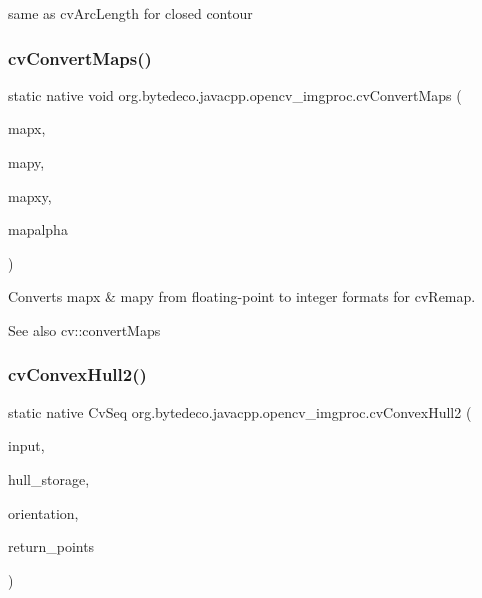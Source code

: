 same as cv\+Arc\+Length for closed contour \mbox{\label{group__imgproc__c_ga9e8c4e8b6609f6bad114d7a6e597d530}} 
\subsubsection{\texorpdfstring{cv\+Convert\+Maps()}{cvConvertMaps()}}
{\footnotesize\ttfamily static native void org.\+bytedeco.\+javacpp.\+opencv\+\_\+imgproc.\+cv\+Convert\+Maps (\begin{DoxyParamCaption}\item[{@Const Cv\+Arr}]{mapx,  }\item[{@Const Cv\+Arr}]{mapy,  }\item[{Cv\+Arr}]{mapxy,  }\item[{Cv\+Arr}]{mapalpha }\end{DoxyParamCaption})\hspace{0.3cm}{\ttfamily [static]}}



Converts mapx \& mapy from floating-\/point to integer formats for cv\+Remap. 

\begin{DoxySeeAlso}{See also}
cv\+::convert\+Maps 
\end{DoxySeeAlso}
\mbox{\label{group__imgproc__c_ga97e54b0658572d02cdef5ae91799499d}} 
\subsubsection{\texorpdfstring{cv\+Convex\+Hull2()}{cvConvexHull2()}}
{\footnotesize\ttfamily static native Cv\+Seq org.\+bytedeco.\+javacpp.\+opencv\+\_\+imgproc.\+cv\+Convex\+Hull2 (\begin{DoxyParamCaption}\item[{@Const Cv\+Arr}]{input,  }\item[{Pointer}]{hull\+\_\+storage,  }\item[{int}]{orientation,  }\item[{int}]{return\+\_\+points }\end{DoxyParamCaption})\hspace{0.3cm}{\ttfamily [static]}}



